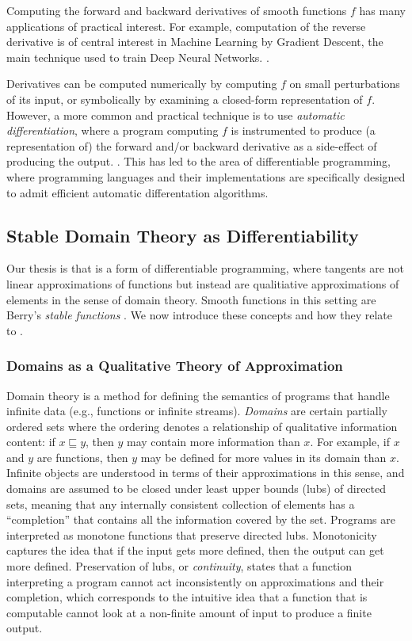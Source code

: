 Computing the forward and backward derivatives of smooth functions $f$ has many applications of practical interest. For example, computation of the reverse derivative is of central interest in Machine Learning by Gradient Descent, the main technique used to train Deep Neural Networks. .

Derivatives can be computed numerically by computing $f$ on small perturbations of its input, or symbolically by examining a closed-form representation of $f$. However, a more common and practical technique is to use \emph{automatic differentiation}, where a program computing $f$ is instrumented to produce (a representation of) the forward and/or backward derivative as a side-effect of producing the output. . This has led to the area of differentiable programming, where programming languages and their implementations are specifically designed to admit efficient automatic differentation algorithms. 

\subsection{Stable Domain Theory as Differentiability}

Our thesis is that \GPS is a form of differentiable programming, where tangents are not linear approximations of functions but instead are qualitiative approximations of elements in the sense of domain theory. Smooth functions in this setting are Berry's \emph{stable functions} \cite{berry}. We now introduce these concepts and how they relate to \GPS.

\subsubsection{Domains as a Qualitative Theory of Approximation}

Domain theory is a method for defining the semantics of programs that handle infinite data (e.g., functions or infinite streams). \emph{Domains} are certain partially ordered sets where the ordering denotes a relationship of qualitative information content: if $x \sqsubseteq y$, then $y$ may contain more information than $x$. For example, if $x$ and $y$ are functions, then $y$ may be defined for more values in its domain than $x$. Infinite objects are understood in terms of their approximations in this sense, and domains are assumed to be closed under least upper bounds (lubs) of directed sets, meaning that any internally consistent collection of elements has a ``completion'' that contains all the information covered by the set. Programs are interpreted as monotone functions that preserve directed lubs. Monotonicity captures the idea that if the input gets more defined, then the output can get more defined. Preservation of lubs, or \emph{continuity}, states that a function interpreting a program cannot act inconsistently on approximations and their completion, which corresponds to the intuitive idea that a function that is computable cannot look at a non-finite amount of input to produce a finite output.

